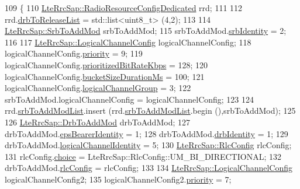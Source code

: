 \begin{DoxyCode}
109 \{
110   \hyperlink{structns3_1_1LteRrcSap_1_1RadioResourceConfigDedicated}{LteRrcSap::RadioResourceConfigDedicated} rrd;
111 
112   rrd.\hyperlink{structns3_1_1LteRrcSap_1_1RadioResourceConfigDedicated_a2828f77c993322793cb4b19cf5cf7cd3}{drbToReleaseList} = std::list<uint8\_t> (4,2);
113 
114   \hyperlink{structns3_1_1LteRrcSap_1_1SrbToAddMod}{LteRrcSap::SrbToAddMod} srbToAddMod;
115   srbToAddMod.\hyperlink{structns3_1_1LteRrcSap_1_1SrbToAddMod_a57de3218fb9a1f32db153cd970f2fc37}{srbIdentity} = 2;
116 
117   \hyperlink{structns3_1_1LteRrcSap_1_1LogicalChannelConfig}{LteRrcSap::LogicalChannelConfig} logicalChannelConfig;
118   logicalChannelConfig.\hyperlink{structns3_1_1LteRrcSap_1_1LogicalChannelConfig_a8db687be39b6631fc05232b6264422f3}{priority} = 9;
119   logicalChannelConfig.\hyperlink{structns3_1_1LteRrcSap_1_1LogicalChannelConfig_ac1a5aeec29094b3f40dae4dc949b4dab}{prioritizedBitRateKbps} = 128;
120   logicalChannelConfig.\hyperlink{structns3_1_1LteRrcSap_1_1LogicalChannelConfig_aaf72b8b1bdaf2286d2481994ef124cb6}{bucketSizeDurationMs} = 100;
121   logicalChannelConfig.\hyperlink{structns3_1_1LteRrcSap_1_1LogicalChannelConfig_ae60ea4e76caeaf8d45098f06498463c4}{logicalChannelGroup} = 3;
122   srbToAddMod.logicalChannelConfig = logicalChannelConfig;
123 
124   rrd.\hyperlink{structns3_1_1LteRrcSap_1_1RadioResourceConfigDedicated_ae5fcfd17974bfa04fce84b6ba46cb47b}{srbToAddModList}.insert (rrd.\hyperlink{structns3_1_1LteRrcSap_1_1RadioResourceConfigDedicated_ae5fcfd17974bfa04fce84b6ba46cb47b}{srbToAddModList}.begin (),srbToAddMod);
125 
126   \hyperlink{structns3_1_1LteRrcSap_1_1DrbToAddMod}{LteRrcSap::DrbToAddMod} drbToAddMod;
127   drbToAddMod.\hyperlink{structns3_1_1LteRrcSap_1_1DrbToAddMod_a156fd260b20b3fdffc127bb212f43a43}{epsBearerIdentity} = 1;
128   drbToAddMod.\hyperlink{structns3_1_1LteRrcSap_1_1DrbToAddMod_ae3a103ccc8b210151f8b497b344f6b92}{drbIdentity} = 1;
129   drbToAddMod.\hyperlink{structns3_1_1LteRrcSap_1_1DrbToAddMod_ad23dad5b21e1b89f3d42f1dbd61cfa75}{logicalChannelIdentity} = 5;
130   \hyperlink{structns3_1_1LteRrcSap_1_1RlcConfig}{LteRrcSap::RlcConfig} rlcConfig;
131   rlcConfig.\hyperlink{structns3_1_1LteRrcSap_1_1RlcConfig_a9c8978e8bd86b61b3ce6209569f38245}{choice} = LteRrcSap::RlcConfig::UM\_BI\_DIRECTIONAL;
132   drbToAddMod.\hyperlink{structns3_1_1LteRrcSap_1_1DrbToAddMod_a67f31637f94f2ce0dbf5d139be73f78e}{rlcConfig} = rlcConfig;
133 
134   \hyperlink{structns3_1_1LteRrcSap_1_1LogicalChannelConfig}{LteRrcSap::LogicalChannelConfig} logicalChannelConfig2;
135   logicalChannelConfig2.\hyperlink{structns3_1_1LteRrcSap_1_1LogicalChannelConfig_a8db687be39b6631fc05232b6264422f3}{priority} = 7;

\end{DoxyCode}
